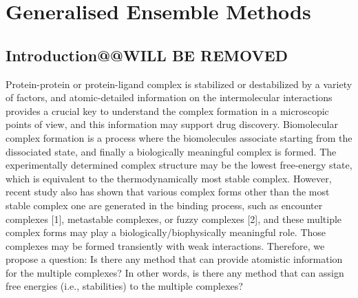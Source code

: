 \chapter{Generalised Ensemble Methods}
{\color {red} 
\section{Introduction@@WILL BE REMOVED}}
Protein-protein or protein-ligand complex is stabilized or destabilized by a variety of factors, and atomic-detailed information on the intermolecular interactions provides a crucial key to understand the complex formation in a microscopic points of view, and this information may support drug discovery. Biomolecular complex formation is a process where the biomolecules associate starting from the dissociated state, and finally a biologically meaningful complex is formed. The experimentally determined complex structure may be the lowest free-energy state, which is equivalent to the thermodynamically most stable complex. However, recent study also has shown that various complex forms other than the most stable complex one are generated in the binding process, such as encounter complexes [1], metastable complexes, or fuzzy complexes [2], and these multiple complex forms may play a biologically/biophysically meaningful role. Those complexes may be formed transiently with weak interactions. Therefore, we propose a question: Is there any method that can provide atomistic information for the multiple complexes? In other words, is there any method that can assign free energies (i.e., stabilities) to the multiple complexes? 

